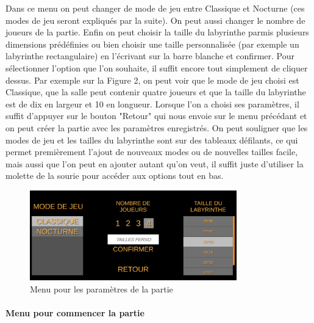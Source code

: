 \documentclass{article}
\begin{document}
Dans ce menu on peut changer de mode de jeu entre Classique et Nocturne (ces modes de jeu seront expliqués par la suite). On peut aussi changer le nombre de joueurs de la partie. Enfin on peut choisir la taille du labyrinthe parmis plusieurs dimensions prédéfinies ou bien choisir une taille personnalisée (par exemple un labyrinthe rectangulaire) en l'écrivant sur la barre blanche et confirmer. Pour sélectionner l'option que l'on souhaite, il suffit encore tout simplement de cliquer dessus. Par exemple sur la Figure 2, on peut voir que le mode de jeu choisi est Classique, que la salle peut contenir quatre joueurs et que la taille du labyrinthe est de dix en largeur et 10 en longueur. Lorsque l'on a choisi ses paramètres, il suffit d'appuyer sur le bouton "Retour" qui nous envoie sur le menu précédant et on peut créer la partie avec les paramètres enregistrés. On peut souligner que les modes de jeu et les tailles du labyrinthe sont sur des tableaux défilants, ce qui permet premièrement l'ajout de nouveaux modes ou de nouvelles tailles facile, mais aussi que l'on peut en ajouter autant qu'on veut, il suffit juste d'utiliser la molette de la sourie pour accéder aux options tout en bas.



\begin{figure}[!ht]
    \centering
    \includegraphics[width=0.8\textwidth]{Menu2.png}
    \caption{Menu pour les paramètres de la partie}
    \label{Menu pour les paramètres de la partie}
\end{figure}


\paragraph{Menu pour commencer la partie}
\end{document}
